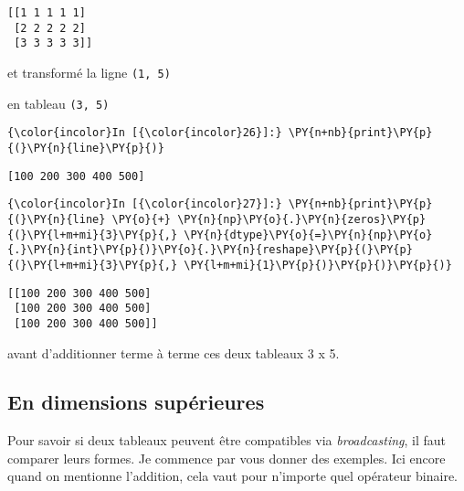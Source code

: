     \begin{Verbatim}[commandchars=\\\{\}]
[[1 1 1 1 1]
 [2 2 2 2 2]
 [3 3 3 3 3]]

    \end{Verbatim}

    et transformé la ligne \texttt{(1,\ 5)}

    en tableau \texttt{(3,\ 5)}

    \begin{Verbatim}[commandchars=\\\{\}]
{\color{incolor}In [{\color{incolor}26}]:} \PY{n+nb}{print}\PY{p}{(}\PY{n}{line}\PY{p}{)}
\end{Verbatim}


    \begin{Verbatim}[commandchars=\\\{\}]
[100 200 300 400 500]

    \end{Verbatim}

    \begin{Verbatim}[commandchars=\\\{\}]
{\color{incolor}In [{\color{incolor}27}]:} \PY{n+nb}{print}\PY{p}{(}\PY{n}{line} \PY{o}{+} \PY{n}{np}\PY{o}{.}\PY{n}{zeros}\PY{p}{(}\PY{l+m+mi}{3}\PY{p}{,} \PY{n}{dtype}\PY{o}{=}\PY{n}{np}\PY{o}{.}\PY{n}{int}\PY{p}{)}\PY{o}{.}\PY{n}{reshape}\PY{p}{(}\PY{p}{(}\PY{l+m+mi}{3}\PY{p}{,} \PY{l+m+mi}{1}\PY{p}{)}\PY{p}{)}\PY{p}{)}
\end{Verbatim}


    \begin{Verbatim}[commandchars=\\\{\}]
[[100 200 300 400 500]
 [100 200 300 400 500]
 [100 200 300 400 500]]

    \end{Verbatim}

    avant d'additionner terme à terme ces deux tableaux 3 x 5.

    \hypertarget{en-dimensions-supuxe9rieures}{%
\subsection{En dimensions
supérieures}\label{en-dimensions-supuxe9rieures}}

    Pour savoir si deux tableaux peuvent être compatibles via
\emph{broadcasting}, il faut comparer leurs formes. Je commence par vous
donner des exemples. Ici encore quand on mentionne l'addition, cela vaut
pour n'importe quel opérateur binaire.

